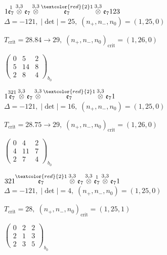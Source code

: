 \documentclass[10pt]{article}
\begin{document}
$1\overset{1}{\mathfrak{e}_7}\overset{3,3}{\otimes}\mathfrak{e}_7\overset{3,3}{\otimes}\overset{\textcolor{red}{2}1}{\mathfrak{e}_7}\overset{3,3}{\otimes}\mathfrak{e}_7123$ \quad $\Delta=-121,\; |\det|=25,\; (n_+,n_-,n_0)=(1,25,0)$

\hspace{1em}$T_{\text{crit}}=28.84 \to 29,\; (n_+,n_-,n_0)_{\text{crit}}=(1,26,0)$

\hspace{2em}$\left(\begin{smallmatrix}0 & 5 & 2 \\ 5 & 14 & 8 \\ 2 & 8 & 4\end{smallmatrix}\right)_{\!b_0}$

\smallskip

$1\overset{321}{\mathfrak{e}_7}\overset{3,3}{\otimes}\mathfrak{e}_7\overset{3,3}{\otimes}\overset{\textcolor{red}{2}1}{\mathfrak{e}_7}\overset{3,3}{\otimes}\mathfrak{e}_71$ \quad $\Delta=-121,\; |\det|=16,\; (n_+,n_-,n_0)=(1,25,0)$

\hspace{1em}$T_{\text{crit}}=28.75 \to 29,\; (n_+,n_-,n_0)_{\text{crit}}=(1,26,0)$

\hspace{2em}$\left(\begin{smallmatrix}0 & 4 & 2 \\ 4 & 11 & 7 \\ 2 & 7 & 4\end{smallmatrix}\right)_{\!b_0}$

$321\overset{\textcolor{red}{2}1}{\mathfrak{e}_7}\overset{3,3}{\otimes}\mathfrak{e}_7\overset{3,3}{\otimes}\overset{1}{\mathfrak{e}_7}\overset{3,3}{\otimes}\mathfrak{e}_71$ \quad $\Delta=-121,\; |\det|=4,\; (n_+,n_-,n_0)=(1,25,0)$

\hspace{1em}$T_{\text{crit}}=28,\; (n_+,n_-,n_0)_{\text{crit}}=(1,25,1)$

\hspace{2em}$\left(\begin{smallmatrix}0 & 2 & 2 \\ 2 & 1 & 3 \\ 2 & 3 & 5\end{smallmatrix}\right)_{\!b_0}$

\smallskip
\end{document}
